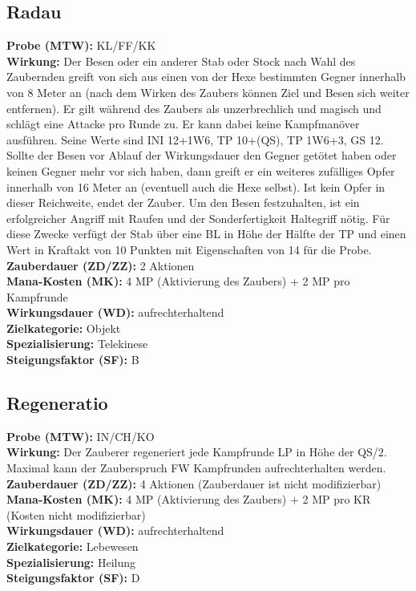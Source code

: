 \subsection{Radau}
\label{chap:radau}
\textbf{Probe (MTW):} KL/FF/KK \\
\textbf{Wirkung:} Der Besen oder ein anderer Stab oder Stock nach Wahl des Zaubernden greift von sich aus einen von der Hexe bestimmten Gegner innerhalb von 8 Meter an (nach dem Wirken des Zaubers können Ziel und Besen sich weiter entfernen). Er gilt während des Zaubers als unzerbrechlich und magisch und schlägt eine Attacke pro Runde zu. Er kann dabei keine Kampfmanöver ausführen. Seine Werte sind INI 12+1W6, TP 10+(QS), TP 1W6+3, GS 12. Sollte der Besen vor Ablauf der Wirkungsdauer den Gegner getötet haben oder keinen Gegner mehr vor sich haben, dann greift er ein weiteres zufälliges Opfer innerhalb von 16 Meter an (eventuell auch die Hexe selbst). Ist kein Opfer in dieser Reichweite, endet der Zauber. Um den Besen festzuhalten, ist ein erfolgreicher Angriff mit Raufen und der Sonderfertigkeit Haltegriff nötig. Für diese Zwecke verfügt der Stab über eine BL in Höhe der Hälfte der TP und einen Wert in Kraftakt von 10 Punkten mit Eigenschaften von 14 für die Probe. \\
\textbf{Zauberdauer (ZD/ZZ):} 2 Aktionen \\
\textbf{Mana-Kosten (MK):} 4 MP (Aktivierung des Zaubers) + 2 MP pro Kampfrunde \\
\textbf{Wirkungsdauer (WD):} aufrechterhaltend \\
\textbf{Zielkategorie:} Objekt \\
\textbf{Spezialisierung:} Telekinese \\
\textbf{Steigungsfaktor (SF):} B


\subsection{Regeneratio}
\label{chap:regeneratio}
\textbf{Probe (MTW):} IN/CH/KO \\
\textbf{Wirkung:} Der Zauberer regeneriert jede Kampfrunde LP in Höhe der QS/2. Maximal kann der Zauberspruch FW Kampfrunden aufrechterhalten werden.\\
\textbf{Zauberdauer (ZD/ZZ):} 4 Aktionen (Zauberdauer ist nicht modifizierbar) \\
\textbf{Mana-Kosten (MK):} 4 MP (Aktivierung des Zaubers) + 2 MP pro KR (Kosten nicht modifizierbar) \\
\textbf{Wirkungsdauer (WD):} aufrechterhaltend \\
\textbf{Zielkategorie:} Lebewesen \\
\textbf{Spezialisierung:} Heilung \\
\textbf{Steigungsfaktor (SF):} D


